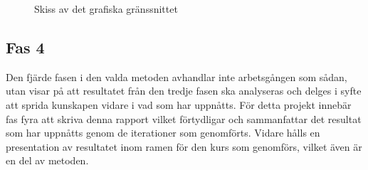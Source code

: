            \begin{figure}[h!]
                
            \caption{\label{fig:app_skiss} Skiss av det grafiska gränssnittet}
            \end{figure}



    \subsection{Fas 4} %
    \label{sub:fas_4}
        Den fjärde fasen i den valda metoden avhandlar inte arbetsgången som sådan, utan visar på att resultatet från den tredje fasen ska analyseras och delges i syfte att sprida kunskapen vidare i vad som har uppnåtts. 
        För detta projekt innebär fas fyra att skriva denna rapport vilket förtydligar och sammanfattar det resultat som har uppnåtts genom de iterationer som genomförts. Vidare hålls en presentation av resultatet inom ramen för den kurs som genomförs, vilket även är en del av metoden.

